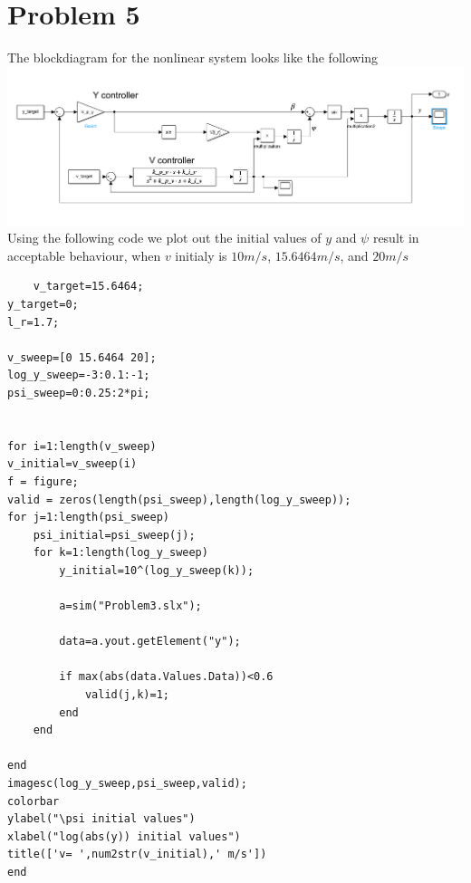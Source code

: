 \documentclass[12pt]{article}
\begin{document}
\section*{Problem 5}
The blockdiagram for the nonlinear system looks like the following\\
\includegraphics[scale=0.4]{Problem5BlockDiagram.PNG}\\
Using the following code we plot out the initial values of $y$ and $\psi$ result in acceptable behaviour, when $v$ initialy is $10m/s$, $15.6464m/s$, and $20m/s$
\begin{verbatim}
    v_target=15.6464;
y_target=0;
l_r=1.7;

v_sweep=[0 15.6464 20];
log_y_sweep=-3:0.1:-1;
psi_sweep=0:0.25:2*pi;


for i=1:length(v_sweep)
v_initial=v_sweep(i)
f = figure;
valid = zeros(length(psi_sweep),length(log_y_sweep));
for j=1:length(psi_sweep)
    psi_initial=psi_sweep(j);
    for k=1:length(log_y_sweep)
        y_initial=10^(log_y_sweep(k));

        a=sim("Problem3.slx");

        data=a.yout.getElement("y");
    
        if max(abs(data.Values.Data))<0.6
            valid(j,k)=1;
        end
    end

end
imagesc(log_y_sweep,psi_sweep,valid);
colorbar
ylabel("\psi initial values")
xlabel("log(abs(y)) initial values")
title(['v= ',num2str(v_initial),' m/s'])
end
\end{verbatim}
\end{document}
